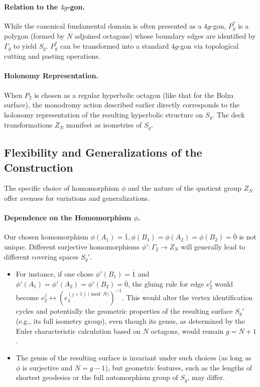 \documentclass{article}
\theoremstyle{definition}
\theoremstyle{remark}
\begin{document}
\paragraph{Relation to the $4g$-gon.}
While the canonical fundamental domain is often presented as a $4g$-gon, $P_g^*$ is a polygon (formed by $N$ adjoined octagons) whose boundary edges are identified by $\Gamma_g$ to yield $S_g$. $P_g^*$ can be transformed into a standard $4g$-gon via topological cutting and pasting operations.

\paragraph{Holonomy Representation.}
When $P_2$ is chosen as a regular hyperbolic octagon (like that for the Bolza surface), the monodromy action described earlier directly corresponds to the holonomy representation of the resulting hyperbolic structure on $S_g$. The deck transformations $Z_N$ manifest as isometries of $S_g$.

\subsection{Flexibility and Generalizations of the Construction}

The specific choice of homomorphism $\phi$ and the nature of the quotient group $Z_N$ offer avenues for variations and generalizations.

\paragraph{Dependence on the Homomorphism $\phi$.}
Our chosen homomorphism $\phi(A_1) = \bar{1}, \phi(B_1) = \phi(A_2) = \phi(B_2) = \bar{0}$ is not unique. Different surjective homomorphisms $\phi': \Gamma_2 \to Z_N$ will generally lead to different covering spaces $S_g'$.
\begin{itemize}
    \item For instance, if one chose $\phi'(B_1) = \bar{1}$ and $\phi'(A_1) = \phi'(A_2) = \phi'(B_2) = \bar{0}$, the gluing rule for edge $e_2^j$ would become $e_2^j \leftrightarrow (e_4^{(j+1) \pmod N})^{-1}$. This would alter the vertex identification cycles and potentially the geometric properties of the resulting surface $S_g'$ (e.g., its full isometry group), even though its genus, as determined by the Euler characteristic calculation based on $N$ octagons, would remain $g = N+1$.
    \item The genus of the resulting surface is invariant under such choices (as long as $\phi$ is surjective and $N=g-1$), but geometric features, such as the lengths of shortest geodesics or the full automorphism group of $S_g$, may differ.
\end{itemize}
\end{document}
